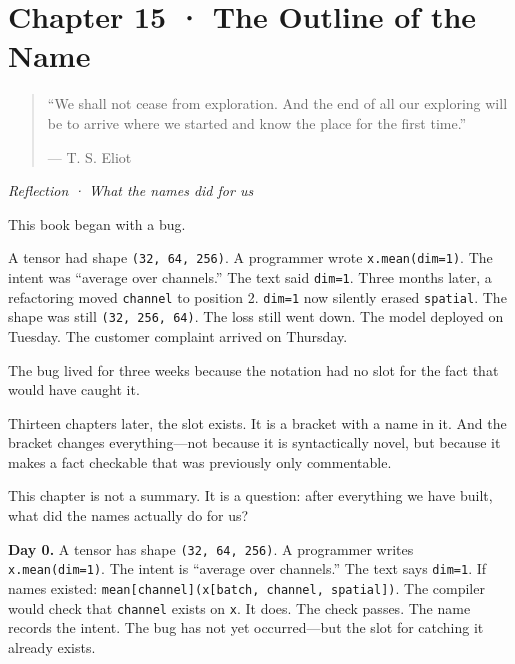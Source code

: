 \documentclass[11pt,titlepage]{article}
\begin{document}
\newpage

\hypertarget{chapter-15-the-outline-of-the-name}{%
\section{Chapter 15 · The Outline of the
Name}\label{chapter-15-the-outline-of-the-name}}

\begin{quote}
``We shall not cease from exploration. And the end of all our exploring
will be to arrive where we started and know the place for the first
time.''

--- T. S. Eliot
\end{quote}

\emph{Reflection · What the names did for us}

\vspace{2em}

This book began with a bug.

A tensor had shape \texttt{(32,\ 64,\ 256)}. A programmer wrote
\texttt{x.mean(dim=1)}. The intent was ``average over channels.'' The
text said \texttt{dim=1}. Three months later, a refactoring moved
\texttt{channel} to position 2. \texttt{dim=1} now silently erased
\texttt{spatial}. The shape was still \texttt{(32,\ 256,\ 64)}. The loss
still went down. The model deployed on Tuesday. The customer complaint
arrived on Thursday.

The bug lived for three weeks because the notation had no slot for the
fact that would have caught it.

Thirteen chapters later, the slot exists. It is a bracket with a name in
it. And the bracket changes everything---not because it is syntactically
novel, but because it makes a fact checkable that was previously only
commentable.

This chapter is not a summary. It is a question: after everything we
have built, what did the names actually do for us?

\vspace{2em}

\textbf{Day 0.} A tensor has shape \texttt{(32,\ 64,\ 256)}. A
programmer writes \texttt{x.mean(dim=1)}. The intent is ``average over
channels.'' The text says \texttt{dim=1}. If names existed:
\texttt{mean{[}channel{]}(x{[}batch,\ channel,\ spatial{]})}. The
compiler would check that \texttt{channel} exists on \texttt{x}. It
does. The check passes. The name records the intent. The bug has not yet
occurred---but the slot for catching it already exists.
\end{document}
